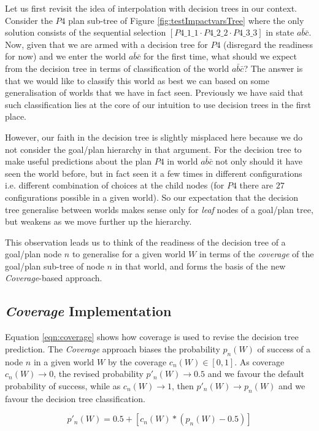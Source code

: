 \documentclass[a4paper]{article}
\newcommand{\cov}{\emph{Coverage}\xspace}
\newcommand{\dt}{{decision tree}\xspace}
\begin{document}
Let us first revisit the idea of interpolation with {\dt}s in our context. Consider the $P4$ plan sub-tree of Figure \ref{fig:testImpactvarsTree} where the only solution consists of the sequential selection $[P4\_1\_1 \cdot P4\_2\_2 \cdot P4\_3\_3]$ in state $a\bar{b}\bar{c}$. Now, given that we are armed with a \dt for $P4$ (disregard the readiness for now) and we enter the world $a\bar{b}\bar{c}$ for the first time, what should we expect from the {\dt} in terms of classification of the world $a\bar{b}\bar{c}$? The answer is that we would like to classify this world as best we can based on some generalisation of worlds that we have in fact seen. Previously we have said that such classification lies at the core of our intuition to use {\dt}s in the first place. 

However, our faith in the \dt is slightly misplaced here because we do not consider the goal/plan hierarchy in that argument. For the \dt to make useful predictions about the plan $P4$ in world $a\bar{b}\bar{c}$ not only should it have seen the world before, but in fact seen it a few times in different configurations i.e. different combination of choices at the child nodes (for $P4$ there are $27$ configurations possible in a given world). So our expectation that the \dt generalise between worlds makes sense only for \textit{leaf} nodes of a goal/plan tree, but weakens as we move further up the hierarchy. 

This observation leads us to think of the readiness of the \dt of a goal/plan node $n$ to generalise for a given world $W$ in terms of the \textit{coverage} of the goal/plan sub-tree of node $n$ in that world, and forms the basis of the new {\cov}-based approach.


\subsection{\cov Implementation}

Equation \ref{eqn:coverage} shows how coverage is used to revise the \dt prediction. The \cov approach biases the probability $p_n(W)$ of success of a node $n$ in a given world $W$ by the coverage $c_n(W) \in [0,1]$. As coverage $ c_n(W) \rightarrow 0$, the revised probability $p'_n(W) \rightarrow 0.5$ and we favour the default probability of success, while as  $ c_n(W) \rightarrow 1$, then $p'_n(W) \rightarrow p_n(W)$ and we favour the \dt classification.

\begin{equation}
\label{eqn:coverage}   
p'_n(W)= 0.5 + \left[  c_n(W) *  \left( p_n(W) - 0.5 \right)  \right]
\end{equation}
\end{document}
